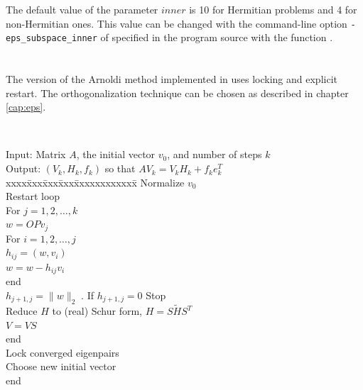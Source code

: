 The default value of the parameter $inner$ is 10 for Hermitian problems and 4 for non-Hermitian ones. This value can be changed with the command-line option \Verb!-eps_subspace_inner! of specified in the program source with the function .

\section{}

The version of the Arnoldi method implemented in \slepc uses locking and explicit restart. The orthogonalization technique can be chosen as described in chapter \ref{cap:eps}.

\begin{algorithm}~\rm
\begin{tabbing}
Input: Matrix $A$, the initial vector $v_0$, and number of steps $k$ \\
Output: $(V_k,H_k,f_k)$ so that $AV_k=V_kH_k+f_ke_k^T$ \\
xxxx\=xxx\=xxx\=xxx\=xxxxxxxxxxxx\=\kill
\> Normalize $v_0$\\
\> Restart loop\\
\> \> For $j=1,2,\ldots,k$\\
\> \> \> $w=O\!Pv_j$ \\
\> \> \> For $i=1,2,\ldots,j$ \\
\> \> \> \> $h_{ij}=(w,v_i)$ \\
\> \> \> \> $w=w-h_{ij}v_i$ \\
\> \> \> end\\
\> \> \> $h_{j+1,j}=\|w\|_2\;$. \> \>If $h_{j+1,j}=0$ Stop \\
\> \> \> Reduce $H$ to (real) Schur form, $H=S\tilde{H}S^T$\\
\> \> \> $V=VS$ \\
\> \> end\\
\> \> Lock converged eigenpairs\\
\> \> Choose new initial vector\\
\> end\\
\end{tabbing}
\end{algorithm}

